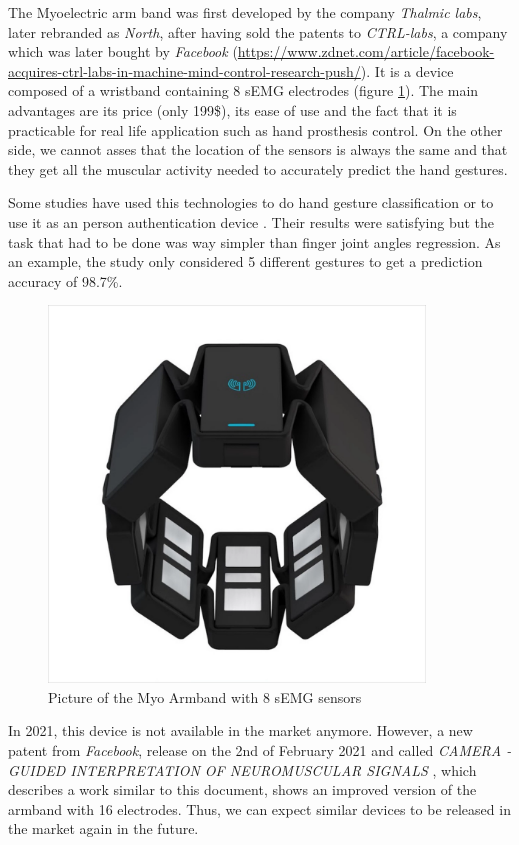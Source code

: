 \documentclass{article}
\begin{document}
	The Myoelectric \cite{ref:myoArmBand} arm band was first developed by the company \textit{Thalmic labs}, later rebranded as \textit{North}, after having sold the patents to \textit{CTRL-labs}, a company which was later bought by \textit{Facebook} (\url{https://www.zdnet.com/article/facebook-acquires-ctrl-labs-in-machine-mind-control-research-push/}). It is a device composed of a wristband containing 8 sEMG electrodes (figure \ref{fig:myoArmband}). The main advantages are its price (only 199\$), its ease of use and the fact that it is practicable for real life application such as hand prosthesis control. On the other side, we cannot asses that the location of the sensors is always the same and that they get all the muscular activity needed to accurately predict the hand gestures.
	
	Some studies have used this technologies to do hand gesture classification \cite{ref:Zhang2019} or to use it as an person authentication device \cite{ref:electronics9122143}. Their results were satisfying but the task that had to be done was way simpler than finger joint angles regression. As an example, the study \cite{ref:Zhang2019} only considered 5 different gestures to get a prediction accuracy of 98.7\%.
	
	
	\begin{figure}[H]
		\centering
		\includegraphics[width=10cm]{images/myoArmBand.png}
		\caption{Picture of the Myo Armband with 8 sEMG sensors \cite{ref:myoArmBand}}
		\label{fig:myoArmband}
	\end{figure}
	
	In 2021, this device is not available in the market anymore. However, a new patent from \textit{Facebook}, release on the 2nd of February 2021 and called \textit{CAMERA - GUIDED INTERPRETATION OF NEUROMUSCULAR SIGNALS } \cite{ref:facebookPatent}, which describes a work similar to this document, shows an improved version of the armband with 16 electrodes. Thus, we can expect similar devices to be released in the market again in the future.
	
\end{document}
